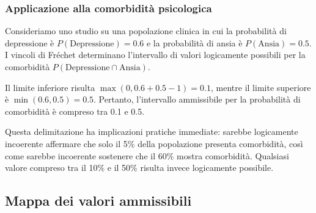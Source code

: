 \documentclass[
  letterpaper,
  DIV=11,
  numbers=noendperiod,
  oneside]{scrreprt}
\theoremstyle{definition}
\theoremstyle{plain}
\theoremstyle{definition}
\theoremstyle{remark}
\begin{document}
\begin{tcolorbox}[enhanced jigsaw, arc=.35mm, breakable, colbacktitle=quarto-callout-note-color!10!white, opacityback=0, toprule=.15mm, rightrule=.15mm, colback=white, opacitybacktitle=0.6, leftrule=.75mm, coltitle=black, bottomtitle=1mm, left=2mm, toptitle=1mm, title=\textcolor{quarto-callout-note-color}{\faInfo}\hspace{0.5em}{Esempio clinico: Depressione e Ansia}, titlerule=0mm, bottomrule=.15mm, colframe=quarto-callout-note-color-frame]

\subsubsection*{Applicazione alla comorbidità
psicologica}\label{applicazione-alla-comorbidituxe0-psicologica}

Consideriamo uno studio su una popolazione clinica in cui la probabilità
di depressione è \(P(\text{Depressione}) = 0.6\) e la probabilità di
ansia è \(P(\text{Ansia}) = 0.5\). I vincoli di Fréchet determinano
l'intervallo di valori logicamente possibili per la comorbidità
\(P(\text{Depressione} \cap \text{Ansia})\).

Il limite inferiore risulta \(\max(0, 0.6 + 0.5 - 1) = 0.1\), mentre il
limite superiore è \(\min(0.6, 0.5) = 0.5\). Pertanto, l'intervallo
ammissibile per la probabilità di comorbidità è compreso tra 0.1 e 0.5.

Questa delimitazione ha implicazioni pratiche immediate: sarebbe
logicamente incoerente affermare che solo il 5\% della popolazione
presenta comorbidità, così come sarebbe incoerente sostenere che il 60\%
mostra comorbidità. Qualsiasi valore compreso tra il 10\% e il 50\%
risulta invece logicamente possibile.

\end{tcolorbox}

\subsection{Mappa dei valori
ammissibili}\label{mappa-dei-valori-ammissibili}
\end{document}
